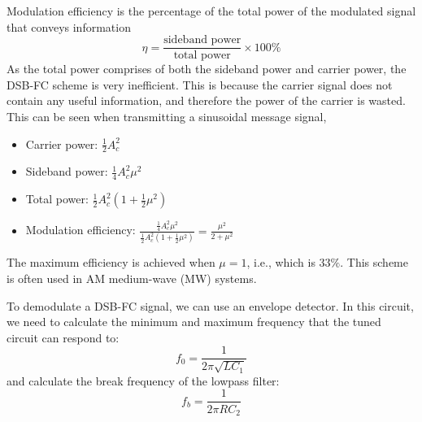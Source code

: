 \documentclass{article}
\begin{document}
Modulation efficiency is the percentage of the total power of the
modulated signal that conveys information
\begin{equation*}
    \eta = \frac{\text{sideband power}}{\text{total power}} \times 100\%
\end{equation*}
As the total power comprises of both the sideband power and carrier
power, the DSB-FC scheme is very inefficient. This is because the
carrier signal does not contain any useful information, and therefore
the power of the carrier is wasted. This can be seen when transmitting a
sinusoidal message signal,
\begin{itemize}
    \item Carrier power: \(\frac{1}{2} A_c^2\)
    \item Sideband power: \(\frac{1}{4} A_c^2 \mu^2\)
    \item Total power: \(\frac{1}{2} A_c^2 \left( 1 + \frac{1}{2}\mu^2
          \right)\)
    \item Modulation efficiency: \(\frac{\frac{1}{4} A_c^2
          \mu^2}{\frac{1}{2} A_c^2 \left( 1 + \frac{1}{2}\mu^2 \right)}
          = \frac{\mu^2}{2 + \mu^2}\)
\end{itemize}
The maximum efficiency is achieved when \(\mu = 1\), i.e., which is \(33\%\).
This scheme is often used in AM medium-wave (MW) systems.

To demodulate a DSB-FC signal, we can use an envelope detector. In this
circuit, we need to calculate the minimum and maximum frequency that
the tuned circuit can respond to:
\begin{equation*}
    f_0 = \frac{1}{2 \pi \sqrt{LC_1}}
\end{equation*}
and calculate the break frequency of the lowpass filter:
\begin{equation*}
    f_b = \frac{1}{2 \pi R C_2}
\end{equation*}
\end{document}
